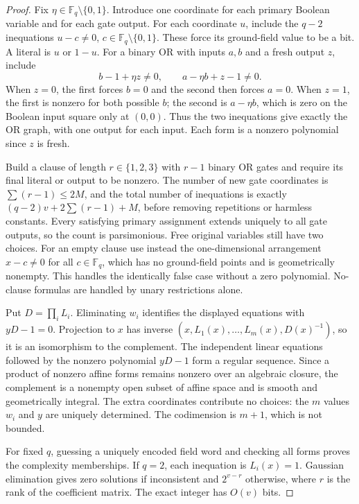 \begin{proof}
Fix $\eta\in\mathbb F_q\setminus\{0,1\}$. Introduce one coordinate for each primary Boolean variable and for each gate output. For each coordinate $u$, include the $q-2$ inequations $u-c\ne0$, $c\in\mathbb F_q\setminus\{0,1\}$. These force its ground-field value to be a bit. A literal is $u$ or $1-u$. For a binary OR with inputs $a,b$ and a fresh output $z$, include
\begin{equation}
\label{ar:eq:twoforms}
 b-1+\eta z\ne0,\qquad a-\eta b+z-1\ne0.
\end{equation}
When $z=0$, the first forces $b=0$ and the second then forces $a=0$. When $z=1$, the first is nonzero for both possible $b$; the second is $a-\eta b$, which is zero on the Boolean input square only at $(0,0)$. Thus the two inequations give exactly the OR graph, with one output for each input. Each form is a nonzero polynomial since $z$ is fresh.

Build a clause of length $r\in\{1,2,3\}$ with $r-1$ binary OR gates and require its final literal or output to be nonzero. The number of new gate coordinates is $\sum(r-1)\le2M$, and the total number of inequations is exactly $(q-2)v+2\sum(r-1)+M$, before removing repetitions or harmless constants. Every satisfying primary assignment extends uniquely to all gate outputs, so the count is parsimonious. Free original variables still have two choices. For an empty clause use instead the one-dimensional arrangement $x-c\ne0$ for all $c\in\mathbb F_q$, which has no ground-field points and is geometrically nonempty. This handles the identically false case without a zero polynomial. No-clause formulas are handled by unary restrictions alone.

Put $D=\prod_iL_i$. Eliminating $w_i$ identifies the displayed equations with $yD-1=0$. Projection to $x$ has inverse $(x,L_1(x),\ldots,L_m(x),D(x)^{-1})$, so it is an isomorphism to the complement. The independent linear equations followed by the nonzero polynomial $yD-1$ form a regular sequence. Since a product of nonzero affine forms remains nonzero over an algebraic closure, the complement is a nonempty open subset of affine space and is smooth and geometrically integral. The extra coordinates contribute no choices: the $m$ values $w_i$ and $y$ are uniquely determined. The codimension is $m+1$, which is not bounded.

For fixed $q$, guessing a uniquely encoded field word and checking all forms proves the complexity memberships. If $q=2$, each inequation is $L_i(x)=1$. Gaussian elimination gives zero solutions if inconsistent and $2^{v-r}$ otherwise, where $r$ is the rank of the coefficient matrix. The exact integer has $O(v)$ bits.
\end{proof}

